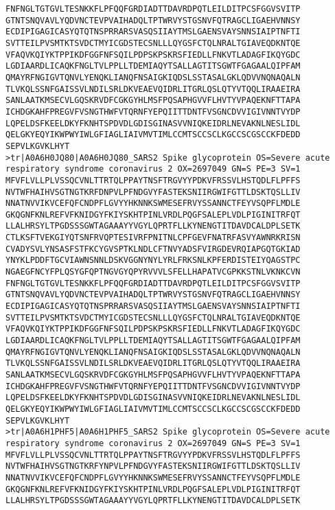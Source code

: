 \begin{lstlisting}
FNFNGLTGTGVLTESNKKFLPFQQFGRDIADTTDAVRDPQTLEILDITPCSFGGVSVITP
GTNTSNQVAVLYQDVNCTEVPVAIHADQLTPTWRVYSTGSNVFQTRAGCLIGAEHVNNSY
ECDIPIGAGICASYQTQTNSPRRARSVASQSIIAYTMSLGAENSVAYSNNSIAIPTNFTI
SVTTEILPVSMTKTSVDCTMYICGDSTECSNLLLQYGSFCTQLNRALTGIAVEQDKNTQE
VFAQVKQIYKTPPIKDFGGFNFSQILPDPSKPSKRSFIEDLLFNKVTLADAGFIKQYGDC
LGDIAARDLICAQKFNGLTVLPPLLTDEMIAQYTSALLAGTITSGWTFGAGAALQIPFAM
QMAYRFNGIGVTQNVLYENQKLIANQFNSAIGKIQDSLSSTASALGKLQDVVNQNAQALN
TLVKQLSSNFGAISSVLNDILSRLDKVEAEVQIDRLITGRLQSLQTYVTQQLIRAAEIRA
SANLAATKMSECVLGQSKRVDFCGKGYHLMSFPQSAPHGVVFLHVTYVPAQEKNFTTAPA
ICHDGKAHFPREGVFVSNGTHWFVTQRNFYEPQIITTDNTFVSGNCDVVIGIVNNTVYDP
LQPELDSFKEELDKYFKNHTSPDVDLGDISGINASVVNIQKEIDRLNEVAKNLNESLIDL
QELGKYEQYIKWPWYIWLGFIAGLIAIVMVTIMLCCMTSCCSCLKGCCSCGSCCKFDEDD
SEPVLKGVKLHYT
>tr|A0A6H0JQ80|A0A6H0JQ80_SARS2 Spike glycoprotein OS=Severe acute respiratory syndrome coronavirus 2 OX=2697049 GN=S PE=3 SV=1
MFVFLVLLPLVSSQCVNLTTRTQLPPAYTNSFTRGVYYPDKVFRSSVLHSTQDLFLPFFS
NVTWFHAIHVSGTNGTKRFDNPVLPFNDGVYFASTEKSNIIRGWIFGTTLDSKTQSLLIV
NNATNVVIKVCEFQFCNDPFLGVYYHKNNKSWMESEFRVYSSANNCTFEYVSQPFLMDLE
GKQGNFKNLREFVFKNIDGYFKIYSKHTPINLVRDLPQGFSALEPLVDLPIGINITRFQT
LLALHRSYLTPGDSSSGWTAGAAAYYVGYLQPRTFLLKYNENGTITDAVDCALDPLSETK
CTLKSFTVEKGIYQTSNFRVQPTESIVRFPNITNLCPFGEVFNATRFASVYAWNRKRISN
CVADYSVLYNSASFSTFKCYGVSPTKLNDLCFTNVYADSFVIRGDEVRQIAPGQTGKIAD
YNYKLPDDFTGCVIAWNSNNLDSKVGGNYNYLYRLFRKSNLKPFERDISTEIYQAGSTPC
NGAEGFNCYFPLQSYGFQPTNGVGYQPYRVVVLSFELLHAPATVCGPKKSTNLVKNKCVN
FNFNGLTGTGVLTESNKKFLPFQQFGRDIADTTDAVRDPQTLEILDITPCSFGGVSVITP
GTNTSNQVAVLYQDVNCTEVPVAIHADQLTPTWRVYSTGSNVFQTRAGCLIGAEHVNNSY
ECDIPIGAGICASYQTQTNSPRRARSVASQSIIAYTMSLGAENSVAYSNNSIAIPTNFTI
SVTTEILPVSMTKTSVDCTMYICGDSTECSNLLLQYGSFCTQLNRALTGIAVEQDKNTQE
VFAQVKQIYKTPPIKDFGGFNFSQILPDPSKPSKRSFIEDLLFNKVTLADAGFIKQYGDC
LGDIAARDLICAQKFNGLTVLPPLLTDEMIAQYTSALLAGTITSGWTFGAGAALQIPFAM
QMAYRFNGIGVTQNVLYENQKLIANQFNSAIGKIQDSLSSTASALGKLQDVVNQNAQALN
TLVKQLSSNFGAISSVLNDILSRLDKVEAEVQIDRLITGRLQSLQTYVTQQLIRAAEIRA
SANLAATKMSECVLGQSKRVDFCGKGYHLMSFPQSAPHGVVFLHVTYVPAQEKNFTTAPA
ICHDGKAHFPREGVFVSNGTHWFVTQRNFYEPQIITTDNTFVSGNCDVVIGIVNNTVYDP
LQPELDSFKEELDKYFKNHTSPDVDLGDISGINASVVNIQKEIDRLNEVAKNLNESLIDL
QELGKYEQYIKWPWYIWLGFIAGLIAIVMVTIMLCCMTSCCSCLKGCCSCGSCCKFDEDD
SEPVLKGVKLHYT
>tr|A0A6H1PHF5|A0A6H1PHF5_SARS2 Spike glycoprotein OS=Severe acute respiratory syndrome coronavirus 2 OX=2697049 GN=S PE=3 SV=1
MFVFLVLLPLVSSQCVNLTTRTQLPPAYTNSFTRGVYYPDKVFRSSVLHSTQDLFLPFFS
NVTWFHAIHVSGTNGTKRFYNPVLPFNDGVYFASTEKSNIIRGWIFGTTLDSKTQSLLIV
NNATNVVIKVCEFQFCNDPFLGVYYHKNNKSWMESEFRVYSSANNCTFEYVSQPFLMDLE
GKQGNFKNLREFVFKNIDGYFKIYSKHTPINLVRDLPQGFSALEPLVDLPIGINITRFQT
LLALHRSYLTPGDSSSGWTAGAAAYYVGYLQPRTFLLKYNENGTITDAVDCALDPLSETK

\end{lstlisting}
